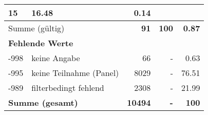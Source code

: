 \begin{longtable}{lXrrr}
       \num{15} &
       \num[round-mode=places,round-precision=2]{16,48} &
         \num[round-mode=places,round-precision=2]{0,14} \\
     \midrule
     \multicolumn{2}{l}{Summe (gültig)} &
       \textbf{\num{91}} &
     \textbf{100} &
       \textbf{\num[round-mode=places,round-precision=2]{0,87}} \\
     \multicolumn{5}{l}{\textbf{Fehlende Werte}}\\
       -998 &
       keine Angabe &
         \num{66} &
        - &
         \num[round-mode=places,round-precision=2]{0,63} \\
       -995 &
       keine Teilnahme (Panel) &
         \num{8029} &
        - &
         \num[round-mode=places,round-precision=2]{76,51} \\
       -989 &
       filterbedingt fehlend &
         \num{2308} &
        - &
         \num[round-mode=places,round-precision=2]{21,99} \\
     \midrule
     \multicolumn{2}{l}{\textbf{Summe (gesamt)}} &
          \textbf{\num{10494}} &
        \textbf{-} &
        \textbf{100} \\
     \bottomrule
     \end{longtable}
     
